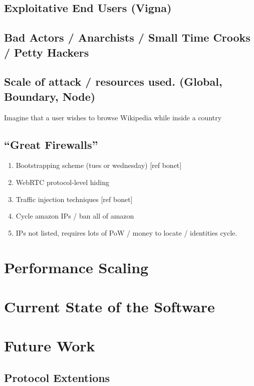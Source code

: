 \documentclass{article}
\begin{document}
\subsection{Exploitative End Users (Vigna)}

\subsection{Bad Actors / Anarchists / Small Time Crooks / Petty Hackers}

\subsection{Scale of attack / resources used. (Global, Boundary, Node)}

Imagine that a user wishes to browse Wikipedia while inside a country

\subsection{“Great Firewalls”}

\begin{enumerate}
    \item Bootstrapping scheme (tues or wednesday) [ref bonet]
    \item WebRTC protocol-level hiding
    \item Traffic injection techniques [ref bonet]
    \item Cycle amazon IPs / ban all of amazon
    \item IPs not listed, requires lots of PoW / money to locate / identities cycle.
\end{enumerate}

\section{Performance Scaling}
\label{sec:performance}

\section{Current State of the Software}
\label{sec:current}

\section{Future Work}
\label{sec:future}

\subsection{Protocol Extentions}
\label{subsec:protocol-extentions}
\end{document}
